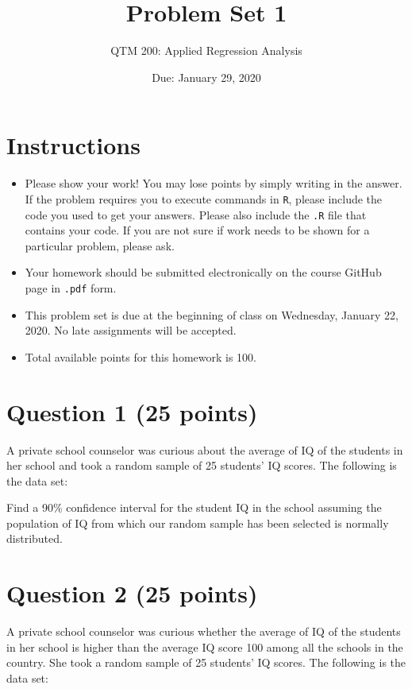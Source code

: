 \documentclass[12pt,letterpaper]{article}
\title{Problem Set 1}
\date{Due: January 29, 2020}
\author{QTM 200: Applied Regression Analysis}
\begin{document}
	\maketitle
	
	\section*{Instructions}
	\begin{itemize}
		\item Please show your work! You may lose points by simply writing in the answer. If the problem requires you to execute commands in \texttt{R}, please include the code you used to get your answers. Please also include the \texttt{.R} file that contains your code. If you are not sure if work needs to be shown for a particular problem, please ask.
		\item Your homework should be submitted electronically on the course GitHub page in \texttt{.pdf} form.
		\item This problem set is due at the beginning of class on Wednesday, January 22, 2020. No late assignments will be accepted.
		\item Total available points for this homework is 100.
	\end{itemize}
	
	\vspace{1cm}
	\section*{Question 1 (25 points)}
	
	A private school counselor was curious about the average of IQ of the students in her school and took a random sample of 25 students' IQ scores. The following is the data set:
	\vspace{.5cm}
	
	  	
	
	\vspace{.5cm}
	
	\noindent Find a 90\% confidence interval for the student IQ in the school assuming the population of IQ from which our random sample has been selected is normally distributed. 
	
	\vspace{1cm}
	  
	\vspace{.5cm}

	
	\section*{Question 2 (25 points)}
	A private school counselor was curious  whether  the average of IQ of the students in her school is higher than the average IQ score 100 among all the schools in the country. She took a random sample of 25 students' IQ scores. The following is the data set:
	\vspace{.5cm}
	  
	\vspace{.5cm}
	
\end{document}

